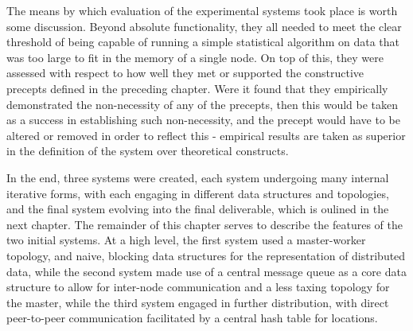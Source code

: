 The means by which evaluation of the experimental systems took place is worth some discussion.
Beyond absolute functionality, they all needed to meet the clear threshold of being capable of running a simple statistical algorithm on data that was too large to fit in the memory of a single node.
On top of this, they were assessed with respect to how well they met or supported the constructive precepts defined in the preceding chapter.
Were it found that they empirically demonstrated the non-necessity of any of the precepts, then this would be taken as a success in establishing such non-necessity, and the precept would have to be altered or removed in order to reflect this - empirical results are taken as superior in the definition of the system over theoretical constructs.

In the end, three systems were created, each system undergoing many internal iterative forms, with each engaging in different data structures and topologies, and the final system evolving into the final deliverable, which is oulined in the next chapter.
The remainder of this chapter serves to describe the features of the two initial systems.
At a high level, the first system used a master-worker topology, and naive, blocking data structures for the representation of distributed data, while the second system made use of a central message queue as a core data structure to allow for inter-node communication and a less taxing topology for the master, while the third system engaged in further distribution, with direct peer-to-peer communication facilitated by a central hash table for locations.